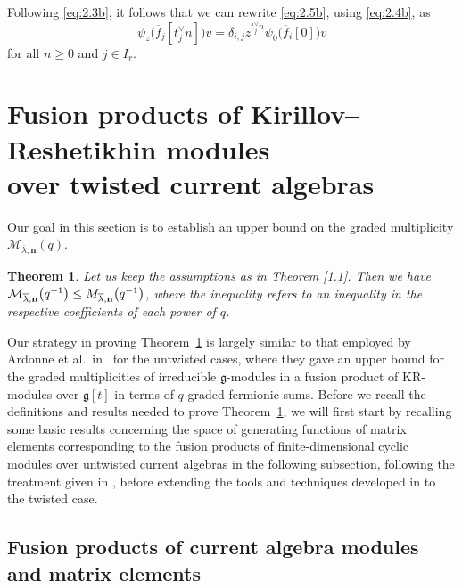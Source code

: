 \documentclass[10pt,a4paper]{amsart}
\numberwithin{equation}{section}
\newtheorem{Theorem}{Theorem}[section]
\begin{document}
Following \eqref{eq:2.3b}, it follows that we can rewrite \eqref{eq:2.5b}, using \eqref{eq:2.4b}, as
\begin{equation}\label{eq:2.6}
\psi_z\bigl(\overline{f}_j[t_j^{\vee}n]\bigr)v =\delta_{i,j}z^{t_j^{\vee}n}\psi_0\bigl(\overline{f}_i[0]\bigr)v
\end{equation}
for all $n\geq0$ and $j\in I_r$.

\section[Fusion products of Kirillov--Reshetikhin modules over twisted current algebras]{Fusion products of Kirillov--Reshetikhin modules\\ over twisted current algebras}\label{Section 3}

Our goal in this section is to establish an upper bound on the graded multiplicity $\mathcal{M}_{\overline{ \lambda},\mathbf{n}}(q)$.

\begin{Theorem}\label{3.1}
Let us keep the assumptions as in Theorem {\rm\ref{1.1}}. Then we have
$\smash{
\mathcal{M}_{\overline{\lambda},\mathbf{n}}}\bigl(q^{-1}\bigr)\leq \smash{M_{\overline{\lambda},\mathbf{n}}}\bigl(q^{-1}\bigr)$,
where the inequality refers to an inequality in the respective coefficients of each power of $q$.
\end{Theorem}

Our strategy in proving Theorem~\ref{3.1} is largely similar to that employed by Ardonne et al.\ in~\cite{AK07,AKS06} for the untwisted cases, where they gave an upper bound for the graded multiplicities of irreducible $\mathfrak{g}$-modules in a fusion product of KR-modules over $\mathfrak{g}[t]$ in terms of $q$-graded fermionic sums. Before we recall the definitions and results needed to prove Theorem~\ref{3.1}, we will first start by recalling some basic results concerning the space of generating functions of matrix elements corresponding to the fusion products of finite-dimensional cyclic modules over untwisted current algebras in the following subsection, following the treatment given in \cite[Section 3.2]{AK07}, before extending the tools and techniques developed in \cite{AK07,AKS06} to the twisted case.

\subsection{Fusion products of current algebra modules and matrix elements}\label{Section 3.1}
\end{document}
